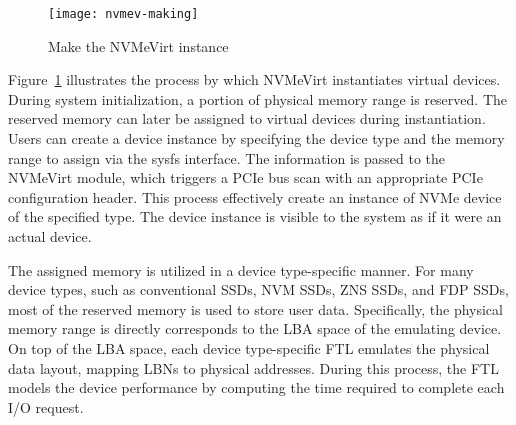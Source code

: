 
\begin{figure}[t]
    \centering
    \texttt{[image: nvmev-making]}
	\caption{Make the NVMeVirt instance}
    \label{fig:making}
\end{figure}

Figure~\ref{fig:making} illustrates the process by which NVMeVirt instantiates virtual devices.
During system initialization, a portion of physical memory range is reserved.
The reserved memory can later be assigned to virtual devices during instantiation.
Users can create a device instance by specifying the device type and the memory range to assign via the sysfs interface.
The information is passed to the NVMeVirt module, which triggers a PCIe bus scan with an appropriate PCIe configuration header.
This process effectively create an instance of NVMe device of the specified type.
The device instance is visible to the system as if it were an actual device.


The assigned memory is utilized in a device type-specific manner.
For many device types, such as conventional SSDs, NVM SSDs, ZNS SSDs, and FDP SSDs, most of the reserved memory is used to store user data.
Specifically, the physical memory range is directly corresponds to the LBA space of the emulating device.
On top of the LBA space, each device type-specific FTL emulates the physical data layout, mapping LBNs to physical addresses.
During this process, the FTL models the device performance by computing the time required to complete each I/O request.



